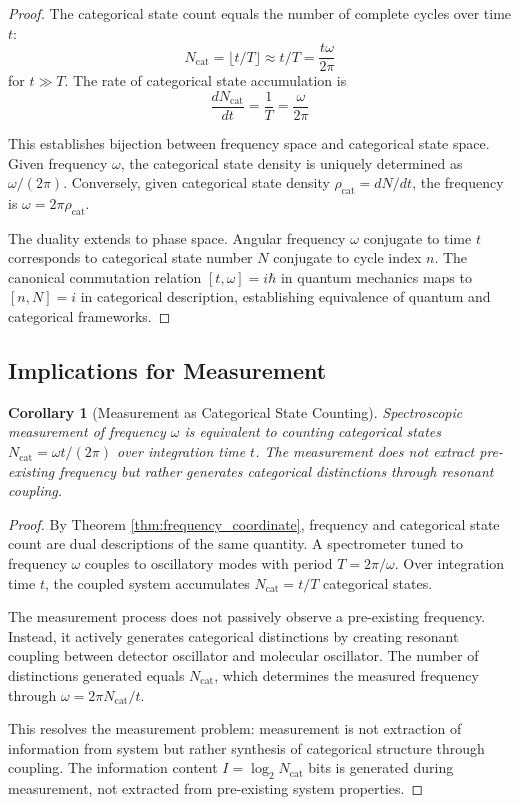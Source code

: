 \documentclass[twocolumn,10pt]{article}
\newtheorem{corollary}[theorem]{Corollary}
\begin{document}
\begin{proof}
The categorical state count equals the number of complete cycles over time $t$:
\begin{equation}
N_{\text{cat}} = \lfloor t/T \rfloor \approx t/T = \frac{t \omega}{2\pi}
\end{equation}
for $t \gg T$. The rate of categorical state accumulation is
\begin{equation}
\frac{dN_{\text{cat}}}{dt} = \frac{1}{T} = \frac{\omega}{2\pi}
\end{equation}

This establishes bijection between frequency space and categorical state space. Given frequency $\omega$, the categorical state density is uniquely determined as $\omega/(2\pi)$. Conversely, given categorical state density $\rho_{\text{cat}} = dN/dt$, the frequency is $\omega = 2\pi \rho_{\text{cat}}$.

The duality extends to phase space. Angular frequency $\omega$ conjugate to time $t$ corresponds to categorical state number $N$ conjugate to cycle index $n$. The canonical commutation relation $[t, \omega] = i\hbar$ in quantum mechanics maps to $[n, N] = i$ in categorical description, establishing equivalence of quantum and categorical frameworks.
\end{proof}

\subsection{Implications for Measurement}

\begin{corollary}[Measurement as Categorical State Counting]
Spectroscopic measurement of frequency $\omega$ is equivalent to counting categorical states $N_{\text{cat}} = \omega t/(2\pi)$ over integration time $t$. The measurement does not extract pre-existing frequency but rather generates categorical distinctions through resonant coupling.
\end{corollary}

\begin{proof}
By Theorem \ref{thm:frequency_coordinate}, frequency and categorical state count are dual descriptions of the same quantity. A spectrometer tuned to frequency $\omega$ couples to oscillatory modes with period $T = 2\pi/\omega$. Over integration time $t$, the coupled system accumulates $N_{\text{cat}} = t/T$ categorical states.

The measurement process does not passively observe a pre-existing frequency. Instead, it actively generates categorical distinctions by creating resonant coupling between detector oscillator and molecular oscillator. The number of distinctions generated equals $N_{\text{cat}}$, which determines the measured frequency through $\omega = 2\pi N_{\text{cat}}/t$.

This resolves the measurement problem: measurement is not extraction of information from system but rather synthesis of categorical structure through coupling. The information content $I = \log_2 N_{\text{cat}}$ bits is generated during measurement, not extracted from pre-existing system properties.
\end{proof}
\end{document}
